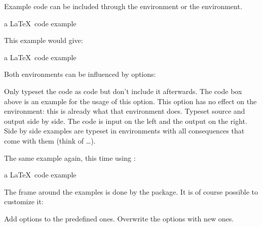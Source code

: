 \documentclass[load-preamble]{cnltx-doc}
\begin{document}
Example code can be included through the  environment or the
 environment.
\begin{sourcecode}
  \begin{example}
    a \LaTeX\ code example
  \end{example}
\end{sourcecode}
This example would give:

\begin{example}
  a \LaTeX\ code example
\end{example}

Both environments can be influenced by options:
\begin{options}
    Only typeset the code as code but don't include it afterwards.  The
    code box above is an example for the usage of this option.  This option
    has no effect on the  environment: this is already what
    that environment does.
    Typeset source and output side by side.  The code is input on the left and
    the output on the right.  Side by side examples are typeset in
     environments with all consequences that come with them
    (think of  \ldots).
\end{options}

The same example again, this time using :

\begin{example}
  a \LaTeX\ code example
\end{example}

The frame around the examples is done by the  package.  It is of
course possible to customize it:
\begin{options}
  \Default
    Add options to the predefined ones.
    Overwrite the options with new ones.
\end{options}
\end{document}
